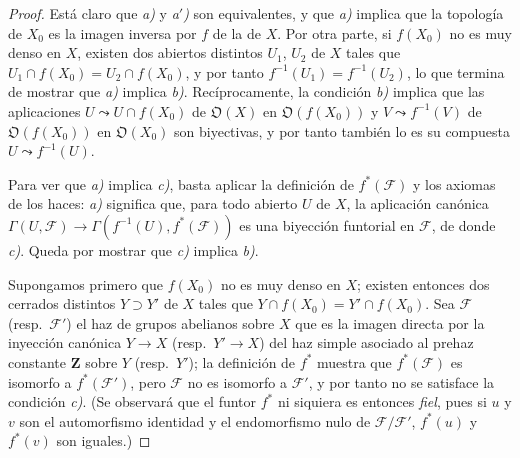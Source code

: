 \begin{proof}
Está claro que \emph{a)} y \emph{a$'$)} son equivalentes, y que \emph{a)} implica que la topología de $X_0$ es la imagen inversa por $f$ de la de $X$.
Por otra parte, si $f(X_0)$ no es muy denso en $X$, existen dos abiertos distintos $U_1$, $U_2$ de $X$ tales que $U_1\cap f(X_0)=U_2\cap f(X_0)$, y por tanto $f^{-1}(U_1)=f^{-1}(U_2)$, lo que termina de mostrar que \emph{a)} implica \emph{b)}.
Recíprocamente, la condición \emph{b)} implica que las aplicaciones $U\leadsto U\cap f(X_0)$ de $\mathfrak O(X)$ en $\mathfrak O(f(X_0))$ y $V\leadsto f^{-1}(V)$ de $\mathfrak O(f(X_0))$ en $\mathfrak O(X_0)$ son biyectivas, y por tanto también lo es su compuesta $U\leadsto f^{-1}(U)$.

Para ver que \emph{a)} implica \emph{c)}, basta aplicar la definición de $f^*(\mathcal F)$  y los axiomas de los haces: \emph{a)} significa que, para todo abierto $U$ de $X$, la aplicación canónica $\Gamma(U,\mathcal F)\to\Gamma(f^{-1}(U),f^*(\mathcal F))$ es una biyección funtorial en $\mathcal F$, de donde \emph{c)}.
Queda por mostrar que \emph{c)} implica \emph{b)}.

Supongamos primero que $f(X_0)$ no es muy denso en $X$; existen entonces dos cerrados distintos $Y\supset Y'$ de $X$ tales que $Y\cap f(X_0)=Y'\cap f(X_0)$.
Sea $\mathcal F$ (resp.\ $\mathcal F'$) el haz de grupos abelianos sobre $X$ que es la imagen directa por la inyección canónica $Y\to X$ (resp.\ $Y'\to X$) del haz simple asociado al prehaz constante $\mathbf Z$ sobre $Y$ (resp.\ $Y'$); la definición de $f^*$  muestra que $f^*(\mathcal F)$ es isomorfo a $f^*(\mathcal F')$, pero $\mathcal F$ no es isomorfo a $\mathcal F'$, y por tanto no se satisface la condición \emph{c)}.
(Se observará que el funtor $f^*$ ni siquiera es entonces \emph{fiel}, pues si $u$ y $v$ son el automorfismo identidad y el endomorfismo nulo de $\mathcal F/\mathcal F'$, $f^*(u)$ y $f^*(v)$ son iguales.)


\end{proof}
